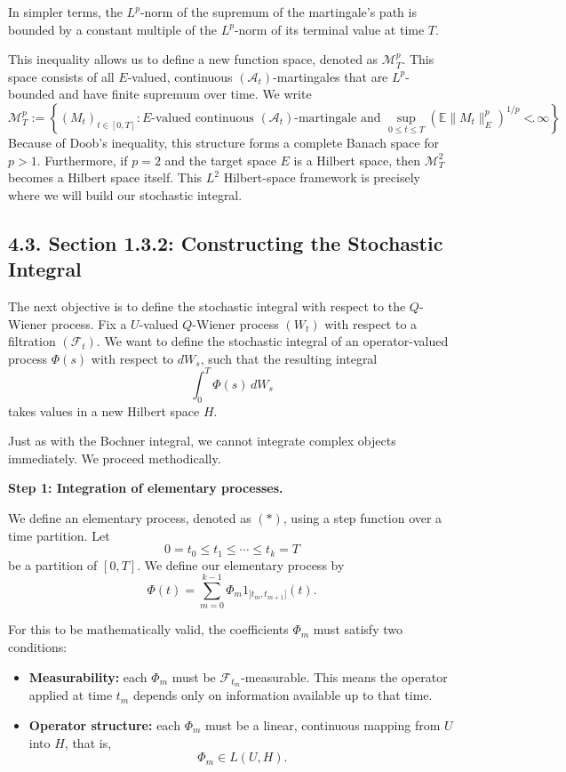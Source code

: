 \documentclass[11pt]{article}
\theoremstyle{definition}
\theoremstyle{remark}
\begin{document}
In simpler terms, the \(L^p\)-norm of the supremum of the martingale's path is bounded by a constant multiple of the \(L^p\)-norm of its terminal value at time \(T\).

This inequality allows us to define a new function space, denoted as \(\mathcal M_T^p\). This space consists of all \(E\)-valued, continuous \((\mathcal A_t)\)-martingales that are \(L^p\)-bounded and have finite supremum over time. We write
\[
\mathcal M_T^p
:=
\left\{(M_t)_{t\in[0,T]}: \text{\(E\)-valued continuous \((\mathcal A_t)\)-martingale and } \sup_{0\le t\le T}\left(\mathbb E\|M_t\|_E^p\right)^{1/p}<\infty\right\}.
\]
Because of Doob's inequality, this structure forms a complete Banach space for \(p>1\). Furthermore, if \(p=2\) and the target space \(E\) is a Hilbert space, then \(\mathcal M_T^2\) becomes a Hilbert space itself. This \(L^2\) Hilbert-space framework is precisely where we will build our stochastic integral.

\subsection*{4.3. Section 1.3.2: Constructing the Stochastic Integral}
The next objective is to define the stochastic integral with respect to the \(Q\)-Wiener process. Fix a \(U\)-valued \(Q\)-Wiener process \((W_t)\) with respect to a filtration \((\mathcal F_t)\). We want to define the stochastic integral of an operator-valued process \(\Phi(s)\) with respect to \(dW_s\), such that the resulting integral
\[
\int_0^T \Phi(s)\,dW_s
\]
takes values in a new Hilbert space \(H\).

Just as with the Bochner integral, we cannot integrate complex objects immediately. We proceed methodically.

\textbf{Step 1: Integration of elementary processes.}

We define an elementary process, denoted as \((*)\), using a step function over a time partition. Let
\[
0=t_0\le t_1\le \cdots \le t_k=T
\]
be a partition of \([0,T]\). We define our elementary process by
\[
\Phi(t)=\sum_{m=0}^{k-1}\Phi_m 1_{]t_m,t_{m+1}]}(t). \tag{*}
\]

For this to be mathematically valid, the coefficients \(\Phi_m\) must satisfy two conditions:
\begin{itemize}
\item \textbf{Measurability:} each \(\Phi_m\) must be \(\mathcal F_{t_m}\)-measurable. This means the operator applied at time \(t_m\) depends only on information available up to that time.
\item \textbf{Operator structure:} each \(\Phi_m\) must be a linear, continuous mapping from \(U\) into \(H\), that is,
\[
\Phi_m\in L(U,H).
\]
\end{itemize}
\end{document}
